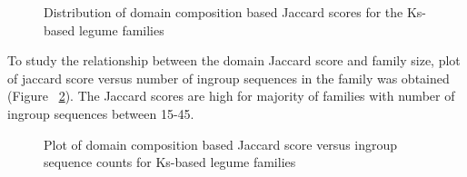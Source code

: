 \documentclass{article}
\begin{document}
		\begin{figure}
			\caption{Distribution of domain composition based Jaccard scores for the Ks-based legume families}
			\label{fig:hist_domain_jaccard_scores_lgf5}
		\end{figure}
		
		To study the relationship between the domain Jaccard score and family size, plot of jaccard score versus number of ingroup sequences in the family was obtained (Figure ~\ref{fig:scatter_domain_jaccard_vs_seq_ct_lgf5}). The Jaccard scores are high for majority of families with number of ingroup sequences between 15-45.
		
		\begin{figure}
			\caption{Plot of domain composition based Jaccard score versus ingroup sequence counts for Ks-based legume families}
			\label{fig:scatter_domain_jaccard_vs_seq_ct_lgf5}
		\end{figure}
		
\end{document}
